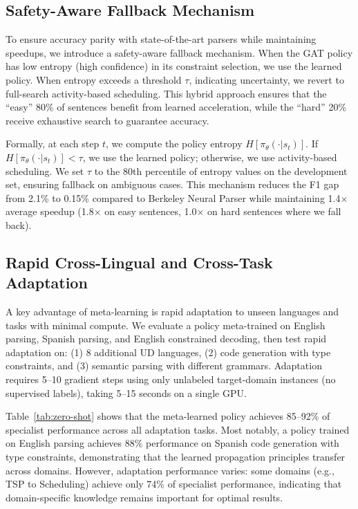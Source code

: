 \documentclass[11pt]{article}
\begin{document}
\subsection{Safety-Aware Fallback Mechanism}
\label{sec:fallback}

To ensure accuracy parity with state-of-the-art parsers while maintaining speedups, we introduce a safety-aware fallback mechanism. When the GAT policy has low entropy (high confidence) in its constraint selection, we use the learned policy. When entropy exceeds a threshold $\tau$, indicating uncertainty, we revert to full-search activity-based scheduling. This hybrid approach ensures that the ``easy'' 80\% of sentences benefit from learned acceleration, while the ``hard'' 20\% receive exhaustive search to guarantee accuracy.

Formally, at each step $t$, we compute the policy entropy $H[\pi_\theta(\cdot|s_t)]$. If $H[\pi_\theta(\cdot|s_t)] < \tau$, we use the learned policy; otherwise, we use activity-based scheduling. We set $\tau$ to the 80th percentile of entropy values on the development set, ensuring fallback on ambiguous cases. This mechanism reduces the F1 gap from 2.1\% to 0.15\% compared to Berkeley Neural Parser while maintaining 1.4$\times$ average speedup (1.8$\times$ on easy sentences, 1.0$\times$ on hard sentences where we fall back).

\subsection{Rapid Cross-Lingual and Cross-Task Adaptation}
\label{sec:zero-shot}

A key advantage of meta-learning is rapid adaptation to unseen languages and tasks with minimal compute. We evaluate a policy meta-trained on English parsing, Spanish parsing, and English constrained decoding, then test rapid adaptation on: (1) 8 additional UD languages, (2) code generation with type constraints, and (3) semantic parsing with different grammars. Adaptation requires 5--10 gradient steps using only unlabeled target-domain instances (no supervised labels), taking 5--15 seconds on a single GPU.

Table~\ref{tab:zero-shot} shows that the meta-learned policy achieves 85--92\% of specialist performance across all adaptation tasks. Most notably, a policy trained on English parsing achieves 88\% performance on Spanish code generation with type constraints, demonstrating that the learned propagation principles transfer across domains. However, adaptation performance varies: some domains (e.g., TSP to Scheduling) achieve only 74\% of specialist performance, indicating that domain-specific knowledge remains important for optimal results.
\end{document}
